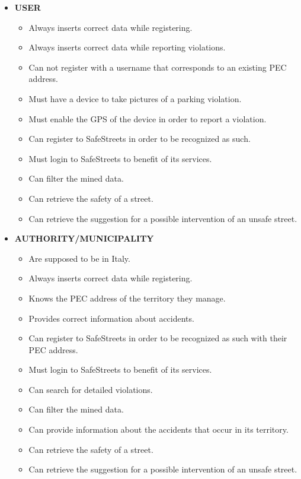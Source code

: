 	\begin{itemize}
		\item \textbf{USER}
			\begin{itemize}
				\item Always inserts correct data while registering.
				\item Always inserts correct data while reporting violations.
				\item Can not register with a username that corresponds to an existing PEC address.
				\item Must have a device to take pictures of a parking violation.
				\item Must enable the GPS of the device in order to report a violation.
				\item Can register to SafeStreets in order to be recognized as such.
				\item Must login to SafeStreets to benefit of its services.
				\item Can filter the mined data.
				\item Can retrieve the safety of a street.
				\item Can retrieve the suggestion for a possible intervention of an unsafe street.
			\end{itemize}
		\item \textbf{AUTHORITY/MUNICIPALITY}
			\begin{itemize}
				\item Are supposed to be in Italy.
				\item Always inserts correct data while registering.
				\item Knows the PEC address of the territory they manage.
				\item Provides correct information about accidents.
				\item Can register to SafeStreets in order to be recognized as such with their PEC address.
				\item Must login to SafeStreets to benefit of its services.
				\item Can search for detailed violations.
				\item Can filter the mined data.
				\item Can provide information about the accidents that occur in its territory.
				\item Can retrieve the safety of a street.
				\item Can retrieve the suggestion for a possible intervention of an unsafe street.
			\end{itemize}
	\end{itemize}
	
